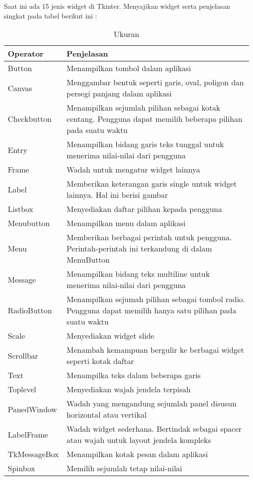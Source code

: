 \documentclass [12pt,a4paper,notitlepage,oneside,bahasa]{article}
\begin{document}
\hspace*{0.5in} Saat ini ada 15 jenis widget di Tkinter. Menyajikan widget serta penjelasan singkat pada tabel berikut ini : 
\vspace{100pt}





\begin{table}[h]
	\caption{Ukuran}
		\begin{center}
		\begin{tabular}{|l|l|}
			\hline
			Operator & Penjelasan \\
			\hline
			Button & Menampilkan tombol dalam aplikasi\\
			Canvas & Menggambar bentuk seperti garis, oval, 
			poligon dan persegi panjang dalam aplikasi\\
			Checkbutton & Menampilkan sejumlah pilihan 
			sebagai kotak centang. Pengguna dapat memilih beberapa pilihan pada suatu waktu\\
			Entry & Menampilkan bidang garis teks tunggal untuk menerima nilai-nilai dari pengguna\\
			Frame & Wadah untuk mengatur widget lainnya\\
			Label & Memberikan keterangan garis single untuk widget lainnya. Hal ini berisi gambar\\
			Listbox & Menyediakan daftar pilihan kepada pengguna\\
			Menubutton & Menampilkan menu dalam aplikasi\\
			Menu & Memberikan berbagai perintah untuk pengguna. Perintah-perintah ini terkandung di dalam MenuButton\\
			Message & Menampilkan bidang teks multiline untuk menerima nilai-nilai dari pengguna\\
			RadioButton & Menampilkan sejumah pilihan sebagai tombol radio. Pengguna dapat memilih hanya satu pilihan pada suatu waktu\\
			Scale & Menyediakan widget slide\\
			Scrollbar & Menambah kemampuan bergulir ke berbagai widget seperti kotak daftar\\
			Text & Menampilka teks dalam beberapa garis\\
			Toplevel & Menyediakan wajah jendela terpisah\\
			PanedWindow & Wadah yang mengandung sejumlah panel disusun horizontal atau vertikal\\
			LabelFrame & Wadah widget sederhana. Bertindak sebagai spacer atau wajah untuk layout jendela kompleks\\
			TkMessageBox & Menampilkan kotak pesan dalam aplikasi\\
			Spinbox & Memilih sejumlah tetap nilai-nilai\\
		\hline
		\end{tabular}
		\end{center}
\end{table}
\end{document}

